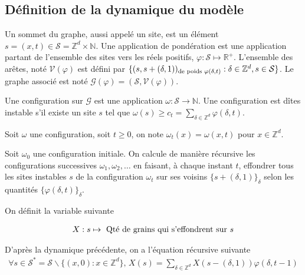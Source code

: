 \documentclass{article}
\theoremstyle{definition}
\begin{document}
\subsection{Définition de la dynamique du modèle}
Un sommet du graphe, aussi appelé un site, est un élément $s=(x,t)\in \mathcal{S} = \mathbb{Z}^d\times \mathbb{N}$. Une application de pondération est une application partant de l'ensemble des sites vers les réels positifs, $\varphi : \mathcal{S}\mapsto \mathbb{R}^+$. L'ensemble des arêtes, noté $\mathcal{V}(\varphi)$ est défini par $\{(s, s+(\delta, 1))_{\textup{de poids } \varphi(\delta, t)} : \delta\in\mathbb{Z}^d, s\in \mathcal{S}\}$. Le graphe associé est noté $\mathcal{G}(\varphi) = (\mathcal{S}, \mathcal{V(\varphi)})$.

Une configuration sur $\mathcal{G}$ est une application $\omega : \mathcal{S}\to \mathbb{N}$. Une configuration est dîtes instable s'il existe un site $s$ tel que $\omega(s)\geq c_t = \sum_{\delta\in\mathbb{Z}^d} \varphi(\delta, t)$. 

Soit $\omega$ une configuration, soit $t\geq 0$, on note $\omega_t(x) = \omega(x, t)$ pour $x\in\mathbb{Z}^d$. 

Soit $\omega_0$ une configuration initiale. On calcule de manière récursive les configurations successives $\omega_1, \omega_2, \ldots$ en faisant, à chaque instant $t$, effondrer tous les sites instables $s$ de la configuration $\omega_t$ sur ses voisins $\{s+(\delta, 1)\}_{\delta}$ selon les quantités $\{\varphi(\delta, t)\}_{\delta}$. 


On définit la variable suivante

\begin{align*}
	X : s \mapsto \textup{ Qté de grains qui s'effondrent sur } s\\
\end{align*}

D'après la dynamique précédente, on a l'équation récursive suivante
\begin{align*}
	\forall s\in\mathcal{S}^* = \mathcal{S}\backslash\{(x,0) : x\in\mathbb{Z}^d\},\, 
	X(s) = \sum_{\delta\in\mathbb{Z}^d} X(s-(\delta, 1))\varphi(\delta, t-1)\\
\end{align*}
\end{document}
